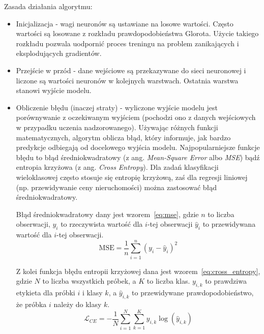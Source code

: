 Zasada działania algorytmu:
\begin{itemize}
    \item Inicjalizacja - wagi neuronów są ustawiane na losowe wartości.
    Często wartości są losowane z rozkładu prawdopodobieństwa Glorota.
    Użycie takiego rozkładu pozwala uodpornić proces treningu na problem zanikających i eksplodujących gradientów.
    \item Przejście w przód - dane wejściowe są przekazywane do sieci neuronowej i liczone są wartości neuronów w kolejnych warstwach.
    Ostatnia warstwa stanowi wyjście modelu.
    \item Obliczenie błędu (inaczej straty) - wyliczone wyjście modelu jest porównywanie z oczekiwanym wyjściem (pochodzi ono z danych wejściowych w przypadku uczenia nadzorowanego).
    Używając różnych funkcji matematycznych, algorytm oblicza błąd, który informuje, jak bardzo predykcje odbiegają od docelowego wyjścia modelu.
    Najpopularniejsze funkcje błędu to błąd średniokwadratowy (z ang. \textit{Mean-Square Error} albo \textit{MSE}) bądź entropia krzyżowa (z ang. \textit{Cross Entropy}).
    Dla zadań klasyfikacji wieloklasowej często stosuje się entropię krzyżową, zaś dla regresji liniowej (np.
    przewidywanie ceny nieruchomości) można zastosować błąd średniokwadratowy.

    Błąd średniokwadratowy dany jest wzorem~\ref{eq:mse}, gdzie $n$ to liczba obserwacji, $y_i$ to rzeczywista wartość dla $i$-tej obserwacji $\hat{y}_i$ to przewidywana wartość dla $i$-tej obserwacji.
    \begin{equation}
        \text{MSE} = \frac{1}{n} \sum_{i=1}^{n} (y_i - \hat{y}_i)^2\label{eq:mse}
    \end{equation}

    Z kolei funkcja błędu entropii krzyżowej dana jest wzorem~\ref{eq:cross_entropy}, gdzie $N$ to liczba wszystkich próbek, a $K$ to liczba klas. $y_{i,k}$ to prawdziwa etykieta dla próbki $i$ i klasy $k$, a $\hat{y}_{i,k}$ to przewidywane prawdopodobieństwo, że próbka $i$ należy do klasy $k$.
    \begin{equation}
        \mathcal{L}_{CE} = -\frac{1}{N} \sum_{i=1}^{N} \sum_{k=1}^{K} y_{i,k} \log(\hat{y}_{i,k})\label{eq:cross_entropy}
    \end{equation}


\end{itemize}
